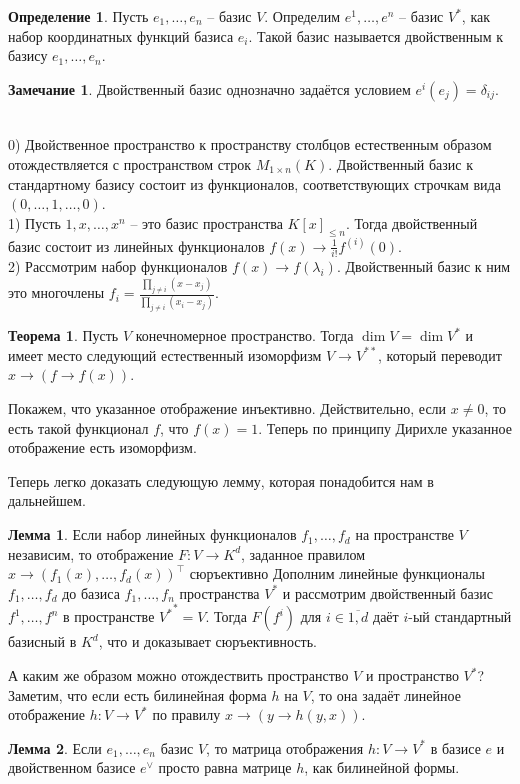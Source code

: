 \documentclass[10pt,a4paper,oneside]{book} %
\theoremstyle{definition}
\newtheorem*{rem}{Замечание}
\newtheorem*{defn}{Определение}
\newtheorem{thm}{Теорема}
\newtheorem{lem}{Лемма}
\newcommand{\ovl}{\overline}
\def\exm{\noindent {\bf Примеры:}}
\def\thrm{\begin{thm}}
\def\ethrm{\end{thm}}
\def\dfn{\begin{defn}}
\def\edfn{\end{defn}}
\def\lm{\begin{lem}}
\def\elm{\end{lem}}
\def\rm{\begin{rem}}
\def\erm{\end{rem}}
\begin{document}
\dfn Пусть $e_1,\dots,e_n$ -- базис $V$. Определим $e^1,\dots, e^n$ -- базис $V^*$, как набор координатных функций базиса $e_i$. Такой базис называется двойственным к базису $e_1,\dots,e_n$. 
\edfn

\rm Двойственный базис однозначно задаётся условием $e^i(e_j)=\delta_{ij}$.
\erm

\exm\\
0) Двойственное пространство к пространству столбцов естественным образом отождествляется с пространством строк $M_{1\times n}(K)$. Двойственный базис к стандартному базису состоит из функционалов, соответствующих строчкам вида $(0,\dots, 1, \dots, 0)$.\\ 
1) Пусть $1,x,\dots, x^n$ -- это базис пространства $K[x]_{\leq n}$. Тогда двойственный базис состоит из линейных функционалов $f(x)\to \frac{1}{i!}f^{(i)}(0)$.\\
2) Рассмотрим набор функционалов $f(x)\to f(\lambda_i)$. Двойственный базис к ним это многочлены $f_i=\frac{\prod_{j\neq i} (x-x_j)}{\prod_{j\neq i}{(x_i-x_j)}}$.




\thrm Пусть $V$ конечномерное пространство. Тогда $\dim V = \dim V^{*} $ и имеет место следующий естественный изоморфизм $V \to V^{**} $, который переводит $x \to (f\to f(x))$.
\ethrm
\proof Покажем, что указанное отображение инъективно. Действительно, если $x\neq 0$, то есть такой функционал $f$, что $f(x)=1$. 
Теперь по принципу Дирихле указанное отображение есть изоморфизм.
\endproof


Теперь легко доказать следующую лемму, которая понадобится нам в дальнейшем.

\lm Если набор линейных функционалов $f_1,\dots,f_d$ на пространстве $V$  независим, то отображение $F\colon V\to K^d$, заданное правилом $x \to (f_1(x),\dots, f_d(x))^{\top}$ сюръективно
\proof Дополним линейные функционалы $f_1,\dots,f_d$ до базиса $f_1,\dots,f_n$ пространства $V^*$ и рассмотрим двойственный базис $f^1,\dots,f^n$ в пространстве ${V^*}^*=V$. Тогда $F(f^i)$ для $i\in\ovl{1,d}$ даёт $i$-ый стандартный базисный в $K^d$, что и доказывает сюръективность.
\endproof
\elm


А каким же образом можно отождествить пространство $V$ и пространство $V^*$?
Заметим, что если есть билинейная форма $h$ на $V$, то она задаёт линейное отображение $h\colon V \to V^*$ по правилу $x \to (y \to h(y,x))$. 

\lm Если $e_1,\dots, e_n$ базис $V$, то матрица отображения $h\colon V \to V^*$ в базисе $e$ и двойственном базисе $e^{\vee}$ просто равна матрице $h$, как билинейной формы.
\elm
\end{document}

